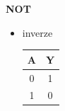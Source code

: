 \begin{frame}
\begin{minipage}[t][0.4\textheight][t]{0.4\textwidth}
		\end{minipage}
		\begin{minipage}[t][0.4\textheight][t]{0.25\textwidth}
      \textbf{NOT}
			
			\begin{itemize}
				\item inverze
				\vspace{5mm}
      
				\begin{tabular}{ c | c}
					A & Y \\
					\hline
					0 & 1 \\
					1 & 0 \\
				\end{tabular}
			\end{itemize}
      
		\end{minipage}
		
	\end{frame}
	

